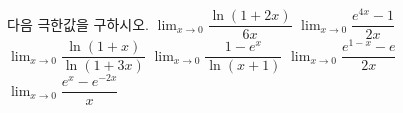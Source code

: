 다음 극한값을 구하시오.
 $\displaystyle\lim_{x\to 0}\dfrac{\ln(1+2x)}{6x}$
 $\displaystyle\lim_{x\to 0}\dfrac{e^{4x}-1}{2x}$
 $\displaystyle\lim_{x\to 0}\dfrac{\ln(1+x)}{\ln(1+3x)}$
 $\displaystyle\lim_{x\to 0}\dfrac{1-e^x}{\ln(x+1)}$
 $\displaystyle\lim_{x\to 0}\dfrac{e^{1-x}-e}{2x}$
 $\displaystyle\lim_{x\to 0}\dfrac{e^x-e^{-2x}}{x}$
